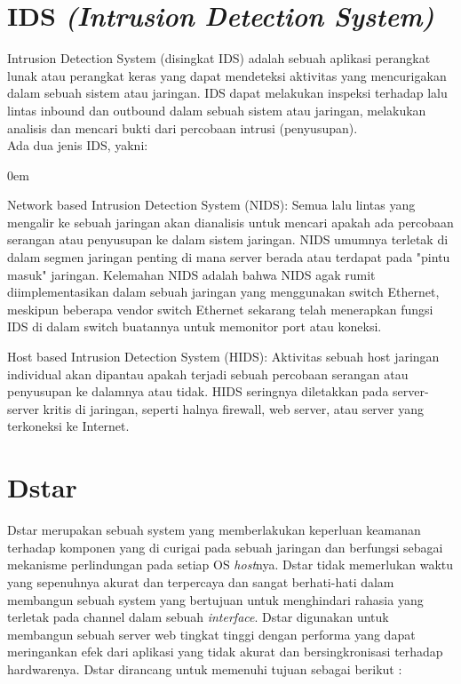 \documentclass{jtetiproposalskripsi}
\begin{document}
\section{IDS \emph{(Intrusion Detection System)}}

Intrusion Detection System (disingkat IDS) adalah sebuah aplikasi perangkat lunak atau perangkat keras yang dapat mendeteksi aktivitas yang mencurigakan dalam sebuah sistem atau jaringan. IDS dapat melakukan inspeksi terhadap lalu lintas inbound  dan outbound dalam sebuah sistem atau jaringan, melakukan analisis dan mencari bukti dari percobaan intrusi (penyusupan).\\

Ada dua jenis IDS, yakni:
\vspace{-0.5cm}

\begin{enumerate}[a.]
\begin{singlespace}
\itemsep0em
\item Network based Intrusion Detection System (NIDS): Semua lalu lintas yang mengalir ke sebuah jaringan akan dianalisis untuk mencari apakah ada percobaan serangan atau penyusupan ke dalam sistem jaringan. NIDS umumnya terletak di dalam segmen jaringan penting di mana server berada atau terdapat pada "pintu masuk" jaringan. Kelemahan NIDS adalah bahwa NIDS agak rumit diimplementasikan dalam sebuah jaringan yang menggunakan switch Ethernet, meskipun beberapa vendor switch Ethernet sekarang telah menerapkan fungsi IDS di dalam switch buatannya untuk memonitor port atau koneksi. 
\item Host based Intrusion Detection System (HIDS): Aktivitas sebuah host jaringan individual akan dipantau apakah terjadi sebuah percobaan serangan atau penyusupan ke dalamnya atau tidak. HIDS seringnya diletakkan pada server-server kritis di jaringan, seperti halnya firewall, web server, atau server yang terkoneksi ke Internet.
 
\end{singlespace}
\end{enumerate}




\section{Dstar}
Dstar merupakan sebuah system yang memberlakukan keperluan keamanan terhadap komponen yang di curigai pada sebuah jaringan dan berfungsi sebagai mekanisme perlindungan pada setiap OS \emph{host}nya. Dstar tidak memerlukan waktu yang sepenuhnya akurat dan terpercaya dan sangat berhati-hati dalam membangun sebuah system yang bertujuan untuk menghindari rahasia yang terletak pada channel dalam sebuah \emph{interface}. Dstar digunakan untuk membangun sebuah server web tingkat tinggi dengan performa yang dapat meringankan efek dari aplikasi yang tidak akurat dan bersingkronisasi terhadap hardwarenya. Dstar dirancang untuk memenuhi tujuan sebagai berikut :
\vspace{-0.5cm}
\end{document}
